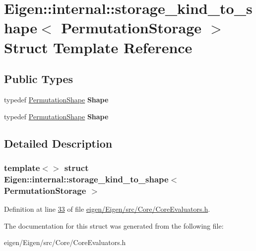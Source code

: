 \hypertarget{struct_eigen_1_1internal_1_1storage__kind__to__shape_3_01_permutation_storage_01_4}{}\section{Eigen\+:\+:internal\+:\+:storage\+\_\+kind\+\_\+to\+\_\+shape$<$ Permutation\+Storage $>$ Struct Template Reference}
\label{struct_eigen_1_1internal_1_1storage__kind__to__shape_3_01_permutation_storage_01_4}
\subsection*{Public Types}
\begin{DoxyCompactItemize}
\item 
\mbox{\label{struct_eigen_1_1internal_1_1storage__kind__to__shape_3_01_permutation_storage_01_4_a9888b41ea7b40b2c9d501c7a038cce75}} 
typedef \hyperlink{struct_eigen_1_1_permutation_shape}{Permutation\+Shape} {\bfseries Shape}
\item 
\mbox{\label{struct_eigen_1_1internal_1_1storage__kind__to__shape_3_01_permutation_storage_01_4_a9888b41ea7b40b2c9d501c7a038cce75}} 
typedef \hyperlink{struct_eigen_1_1_permutation_shape}{Permutation\+Shape} {\bfseries Shape}
\end{DoxyCompactItemize}


\subsection{Detailed Description}
\subsubsection*{template$<$$>$\newline
struct Eigen\+::internal\+::storage\+\_\+kind\+\_\+to\+\_\+shape$<$ Permutation\+Storage $>$}



Definition at line \hyperlink{eigen_2_eigen_2src_2_core_2_core_evaluators_8h_source_l00033}{33} of file \hyperlink{eigen_2_eigen_2src_2_core_2_core_evaluators_8h_source}{eigen/\+Eigen/src/\+Core/\+Core\+Evaluators.\+h}.



The documentation for this struct was generated from the following file\+:\begin{DoxyCompactItemize}
\item 
eigen/\+Eigen/src/\+Core/\+Core\+Evaluators.\+h\end{DoxyCompactItemize}

